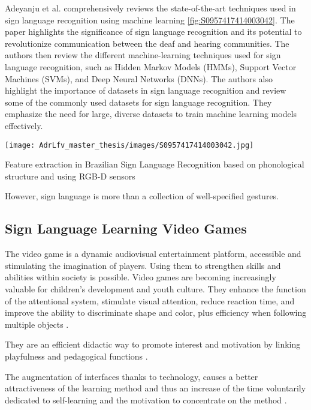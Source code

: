Adeyanju et al. comprehensively reviews the state-of-the-art techniques used in sign language recognition using machine learning \cite{almeida2014feature} \ref{fig:S0957417414003042}. The paper highlights the significance of sign language recognition and its potential to revolutionize communication between the deaf and hearing communities. The authors then review the different machine-learning techniques used for sign language recognition, such as Hidden Markov Models (HMMs), Support Vector Machines (SVMs), and Deep Neural Networks (DNNs).
The authors also highlight the importance of datasets in sign language recognition and review some of the commonly used datasets for sign language recognition. They emphasize the need for large, diverse datasets to train machine learning models effectively.

\begin{marginfigure}
    \centering
    \texttt{[image: AdrLfv\_master\_thesis/images/S0957417414003042.jpg]}
    \caption{Feature extraction in Brazilian Sign Language Recognition based on phonological structure and using RGB-D sensors}
    \label{fig:S0957417414003042}
\end{marginfigure}

However, sign language is more than a collection of well-specified gestures.


\subsection{Sign Language Learning Video Games}

The video game is a dynamic audiovisual entertainment platform, accessible and stimulating the imagination of players. Using them to strengthen skills and abilities within society is possible. Video games are becoming increasingly valuable for children's development and youth culture.
They enhance the function of the attentional system, stimulate visual attention, reduce reaction time, and improve the ability to discriminate shape and color, plus efficiency when following multiple objects \cite{green2006enumeration}.

They are an efficient didactic way to promote interest and motivation by linking playfulness and pedagogical functions \cite{tejeiro2009efectos}.

The augmentation of interfaces thanks to technology, causes a better attractiveness of the learning method and thus an increase of the time voluntarily dedicated to self-learning and the motivation to concentrate on the method \cite{baker1994technology}.

